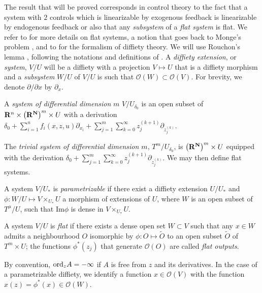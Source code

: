 \documentclass[A4paper, 12pt]{article}
\def\cO{{\mathcal O}}
\def\ord{{\rm ord}}
\def\N{{\bf N}}
\def\R{{\bf R}}
\def\textem#1{{\em #1\/}}
\newcounter{thenum}
\newenvironment{e-definition}{\medbreak\refstepcounter{thenum}
\noindent\textsc{Definition} \thethenum. ---  \it  }{\rm }
\begin{document}
\noindent The result that will be proved corresponds in control theory
to the fact that a system with $2$ controls which is linearizable by
exogenous feedback is linearizable by endogenous feedback or also that
any \textem{subsystem} of a \textem{flat system} is flat. We
refer to \cite{fliess,fliess3,Sira-Ramirez2004,Levine2009} for more details on flat
systems, a notion that goes back to Monge's problem
\cite{Monge1787,Hilbert1912,Cartan1915,Zervos1932}, and to
\cite{vinogradov,zharinov,fliess2} for the formalism of diffiety theory. We
will use 
Rouchon's lemma \cite{Rouchon1994,Ollivier1998}, following the
notations and definitions of \cite{OllivierSadik2006a}. A
\textem{diffiety extension}, or \textem{system}, $V/U$ will be a
diffiety with a projection $V\mapsto U$ that is a diffiety morphism
and a \textem{subsystem} $W/U$ of $V/U$ is such that
$\cO(W)\subset\cO(V)$. For brevity, we denote $\partial/\partial x$ by
$\partial_{x}$. 
\bigskip

A \textem{system of differential dimension} $m$
$V/U_{\delta_{0}}$ is an open subset of
$\R^{n}\times\left(\R^{\N}\right)^{m}\times U$ with a derivation
$\delta_{0}+\sum_{i=1}^{n}f_{i}(x,z,u)\partial_{x_{i}}+\sum_{j=1}^{m}\sum_{k=0}^{\infty}
z_{j}^{(k+1)}\partial_{z_{j}^{(k)}}$.

The \textem{trivial system of differential dimension $m$},
$T^{m}/U_{\delta_{0}}$, is $\left(\R^{\N}\right)^{m}\times U$ equipped
with the derivation $\delta_{0}+\sum_{j=1}^{m}\sum_{k=0}^{\infty}
z_{j}^{(k+1)}\partial_{z_{j}^{(k)}}$. We may then define flat systems.
\medskip

\begin{e-definition}\label{e-flatness} 
A system $V/U_{\ast}$ is \textem{parametrizable} if there exist a
diffiety extension $U/U_{\ast}$ and $\phi:W/U\mapsto
V\times_{U_{\ast}}U$ a morphism of extensions of $U$, where $W$ is an
open subset of $T^{\mu}/U$, such that $\mathrm{Im}\phi$ is dense in
$V\times_{U_{\ast}}U$.
\smallskip

A system $V/U$ is \textem{flat} if there exists a dense
  open set $W\subset V$ such that any $x\in W$ admits a neighbourhood
  $O$ isomorphic by $\phi: O\mapsto \tilde O$ to an open subset $\tilde
  O$ of $T^{m}\times U$; the functions $\phi^{\ast}(z_{j})$
  that generate $\cO(O)$ are called \textem{flat outputs}.
\end{e-definition}
\bigskip

By convention, $\ord_{z}A=-\infty$ if $A$ is free from $z$ and its
derivatives. In the case of a parametrizable diffiety, we identify a
function $x\in\cO(V)$ with the function
$x(z)=\phi^{\ast}(x)\in\cO(W)$.
\end{document}
